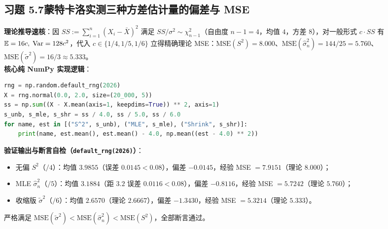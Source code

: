 \subsection*{习题 5.7\quad 蒙特卡洛实测三种方差估计量的偏差与 MSE}
\textbf{理论推导速核}：因 $SS := \sum_{i=1}^n (X_i - \bar{X})^2$ 满足 $SS/\sigma^2 \sim \chi^2_{n-1}$（自由度 $n-1=4$，均值 $4$，方差 $8$），对一般形式 $c\cdot SS$ 有 $\mathbb{E} = 16c,\; \operatorname{Var} = 128c^2$，代入 $c \in \{1/4, 1/5, 1/6\}$ 立得精确理论 MSE：$\mathrm{MSE}(S^2)=8.000$、$\mathrm{MSE}(\hat{\sigma}_n^2)=144/25=5.760$、$\mathrm{MSE}(\tilde{\sigma}^2)=16/3\approx 5.333$。\\
\textbf{核心纯 NumPy 实现逻辑}：
\begin{lstlisting}[language=Python]
rng = np.random.default_rng(2026)
X = rng.normal(0.0, 2.0, size=(20_000, 5))
ss = np.sum((X - X.mean(axis=1, keepdims=True)) ** 2, axis=1)
s_unb, s_mle, s_shr = ss / 4.0, ss / 5.0, ss / 6.0
for name, est in [("S^2", s_unb), ("MLE", s_mle), ("Shrink", s_shr)]:
    print(name, est.mean(), est.mean() - 4.0, np.mean((est - 4.0) ** 2))
\end{lstlisting}
\textbf{验证输出与断言自检（\texttt{default\_rng(2026)}）}：
\begin{itemize}
  \item 无偏 $S^2$（$/4$）：均值 $3.9855$（误差 $0.0145 < 0.08$），偏差 $-0.0145$，经验 MSE $= \mathbf{7.9151}$（理论 $8.000$）；
  \item MLE $\hat{\sigma}_n^2$（$/5$）：均值 $3.1884$（距 $3.2$ 误差 $0.0116 < 0.08$），偏差 $-0.8116$，经验 MSE $= \mathbf{5.7242}$（理论 $5.760$）；
  \item 收缩版 $\tilde{\sigma}^2$（$/6$）：均值 $2.6570$（理论 $2.6667$），偏差 $-1.3430$，经验 MSE $= \mathbf{5.3214}$（理论 $5.333$）。
\end{itemize}
严格满足 $\mathrm{MSE}(\tilde{\sigma}^2) < \mathrm{MSE}(\hat{\sigma}_n^2) < \mathrm{MSE}(S^2)$，全部断言通过。

